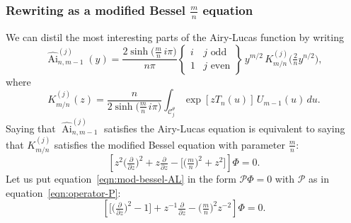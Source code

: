 \documentclass{article}
\DeclareMathOperator{\Ai}{Ai}
\theoremstyle{definition}
\theoremstyle{plain}
\begin{document}
\subsubsection{Rewriting as a modified Bessel $\frac{m}{n}$ equation}
We can distil the most interesting parts of the Airy-Lucas function by writing
\[ \widehat{\Ai}^{(j)}_{n, m-1}(y) = \frac{2 \sinh\big(\tfrac{m}{n}\,i\pi\big)}{n\pi} \left\{\begin{array}{ll}i & j \text{ odd} \\ 1 & j \text{ even}\end{array}\right\}\,y^{{m/2}}\,K^{(j)}_{m/n}\big(\tfrac{2}{n} y^{n/2}\big), \]
where
\begin{equation}\label{integral:mod-bessel-rational-AL}
K^{(j)}_{m/n}(z) = \frac{n}{2 \sinh\big(\tfrac{m}{n}\,i\pi\big)}\int_{\mathcal{C}^\theta_j} \exp\left[z T_n(u)\right]\,U_{m-1}(u)\,du.
\end{equation}
Saying that $\widehat{\Ai}^{(j)}_{n, m-1}$ satisfies the Airy-Lucas equation is equivalent to saying that $K^{(j)}_{m/n}$ satisfies the modified Bessel equation with parameter $\frac{m}{n}$:
\begin{equation}\label{eqn:mod-bessel-AL}
\left[z^2 \big(\tfrac{\partial}{\partial z}\big)^2 + z \tfrac{\partial}{\partial z} - \big[\big(\tfrac{m}{n} \big)^2 + z^2\big]\right] \Phi = 0.
\end{equation}
Let us put equation~\eqref{eqn:mod-bessel-AL} in the form $\mathcal{P}\Phi=0$ with $\mathcal{P}$ as in equation~\eqref{eqn:operator-P}:
\begin{equation}\label{eqn:reg-mod-bessel-AL}
\left[ \big[ \big(\tfrac{\partial}{\partial z}\big)^2 - 1 \big] + z^{-1} \tfrac{\partial}{\partial z} - \big({\tfrac{m}{n}}\big)^2 z^{-2} \right] \Phi = 0.
\end{equation}
%
\end{document}
